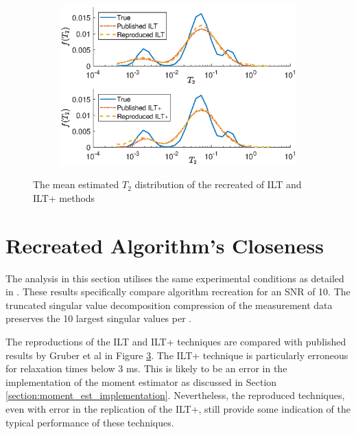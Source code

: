\begin{figure}[htb!]
\begin{subfigure}[b]{0.49\textwidth}
        \label{fig:model3Recreation}
    \end{subfigure}
    \begin{subfigure}[b]{0.49\textwidth}
        \includegraphics[width=\textwidth]{evaluation/model4_recreate.eps}
        \label{fig:model4Recreation}
    \end{subfigure}    
    \caption{The mean estimated $T_2$ distribution of the recreated of ILT and ILT+ methods}
    \label{fig:mean_recreated}
\end{figure}

\section{Recreated Algorithm's Closeness}
The analysis in this section utilises the same experimental conditions as detailed in \cite{GruberT2Estimation2013}. These results specifically compare algorithm recreation for an SNR of 10. The truncated singular value decomposition compression of the measurement data preserves the 10 largest singular values per \cite{GruberT2Estimation2013}.



The reproductions of the ILT and ILT+ techniques are compared with published results by Gruber et al \cite{GruberT2Estimation2013} in Figure \ref{fig:mean_recreated}. The ILT+ technique is particularly erroneous for relaxation times below 3 ms. This is likely to be an error in the implementation of the moment estimator as discussed in Section \ref{section:moment_est_implementation}. Nevertheless, the reproduced techniques, even with error in the replication of the ILT+, still provide some indication of the typical performance of these techniques.

